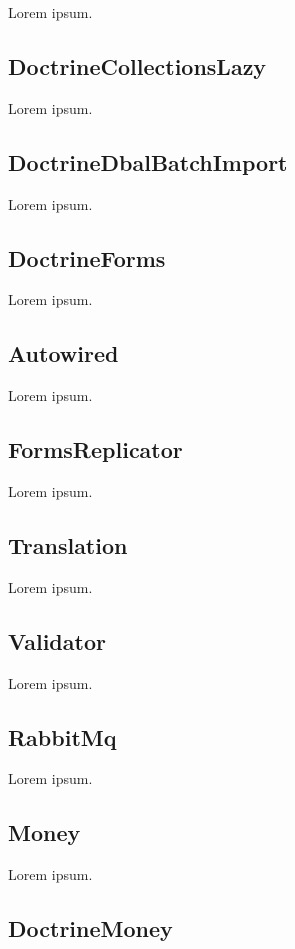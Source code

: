 Lorem ipsum.

\subsection{DoctrineCollectionsLazy}

Lorem ipsum.

\subsection{DoctrineDbalBatchImport}

Lorem ipsum.

\subsection{DoctrineForms}

Lorem ipsum.

\subsection{Autowired}

Lorem ipsum.

\subsection{FormsReplicator}

Lorem ipsum.

\subsection{Translation}

Lorem ipsum.

\subsection{Validator}

Lorem ipsum.

\subsection{RabbitMq}

Lorem ipsum.

\subsection{Money}

Lorem ipsum.

\subsection{DoctrineMoney}

